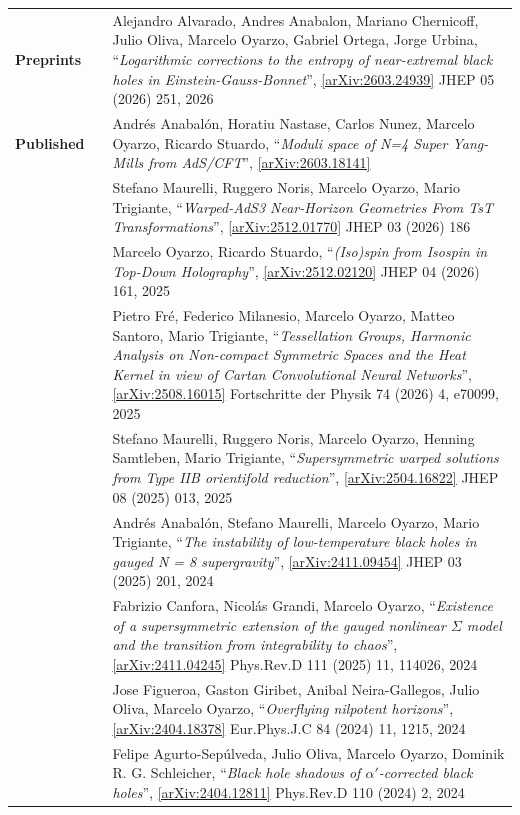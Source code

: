 \documentclass[11pt]{article}
\newenvironment{cvblock}[3]
{
\noindent
\begin{longtable}{p{#1}  >{\raggedright\arraybackslash}p{#2} p{#3}}
}
{
\end{longtable}
}
\newcommand{\cventry}[3]{\textbf{#1} & #2 & #3 \\ }
\newcommand{\paper}[4]{\small #2, “\textit{#1}”, \href{https://arxiv.org/abs/#3}{[arXiv:#3]} #4 \vspace{0.2cm}}
\begin{document}
\begin{cvblock}{1.8cm}{0cm}{13cm}
	\cventry{Preprints}{}{\paper{Logarithmic corrections to the entropy of near-extremal black holes in Einstein-Gauss-Bonnet}{Alejandro Alvarado, Andres Anabalon, Mariano Chernicoff, Julio Oliva, Marcelo Oyarzo, Gabriel Ortega, Jorge Urbina}{2603.24939}{JHEP 05 (2026) 251, 2026} }

	\cventry{Published}{}{\paper{Moduli space of N=4 Super Yang-Mills from AdS/CFT}{Andrés Anabalón, Horatiu Nastase, Carlos Nunez, Marcelo Oyarzo, Ricardo Stuardo}{2603.18141}{}}

	\cventry{}{}{\paper{Warped-AdS3 Near-Horizon Geometries From TsT Transformations}{Stefano Maurelli, Ruggero Noris, Marcelo Oyarzo, Mario Trigiante}{2512.01770}{JHEP 03 (2026) 186}}

	\cventry{}{}{\paper{(Iso)spin from Isospin in Top-Down Holography}{Marcelo Oyarzo, Ricardo Stuardo}{2512.02120}{JHEP 04 (2026) 161, 2025}}

	\cventry{}{}{\paper{Tessellation Groups, Harmonic Analysis on Non-compact Symmetric Spaces and the Heat Kernel in view of Cartan Convolutional Neural Networks}{Pietro Fré, Federico Milanesio, Marcelo Oyarzo, Matteo Santoro, Mario Trigiante}{2508.16015}{Fortschritte der Physik 74 (2026) 4, e70099, 2025}}

	\cventry{}{}{\paper{Supersymmetric warped solutions from Type IIB orientifold reduction}{Stefano Maurelli, Ruggero Noris, Marcelo Oyarzo, Henning Samtleben, Mario Trigiante}{2504.16822}{JHEP 08 (2025) 013, 2025}}

	\cventry{}{}{\paper{The instability of low-temperature black holes in gauged N = 8 supergravity}{Andrés Anabalón, Stefano Maurelli, Marcelo Oyarzo, Mario Trigiante}{2411.09454}{JHEP 03 (2025) 201, 2024}}

	\cventry{}{}{\paper{Existence of a supersymmetric extension of the gauged nonlinear $\Sigma$ model and the transition from integrability to chaos}{Fabrizio Canfora, Nicolás Grandi, Marcelo Oyarzo}{2411.04245}{Phys.Rev.D 111 (2025) 11, 114026, 2024}}

	\cventry{}{}{\paper{Overflying nilpotent horizons}{Jose Figueroa, Gaston Giribet, Anibal Neira-Gallegos, Julio Oliva, Marcelo Oyarzo}{2404.18378}{Eur.Phys.J.C 84 (2024) 11, 1215, 2024}}

	\cventry{}{}{\paper{Black hole shadows of $\alpha'$-corrected black holes}{Felipe Agurto-Sepúlveda, Julio Oliva, Marcelo Oyarzo, Dominik R. G. Schleicher}{2404.12811}{Phys.Rev.D 110 (2024) 2, 2024}}


\end{cvblock}
\end{document}

